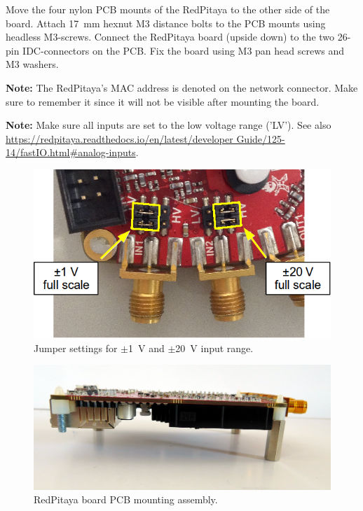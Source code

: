 \documentclass[twoside,a4paper]{refart}
\begin{document}
Move the four nylon PCB mounts of the RedPitaya to the other side of the board. Attach \SI{17}{\milli\meter} hexnut M3 distance bolts to the PCB mounts using headless M3-screws. Connect the RedPitaya board (upside down) to the two 26-pin IDC-connectors on the PCB. Fix the board using M3 pan head screws and M3 washers.

\textbf{Note:} The RedPitaya's MAC address is denoted on the network connector. Make sure to remember it since it will not be visible after mounting the board. 

\textbf{Note:} Make sure all inputs are set to the low voltage range ('LV'). See also \href{https://redpitaya.readthedocs.io/en/latest/developerGuide/125-14/fastIO.html#analog-inputs}{https://redpitaya.readthedocs.io/en/latest/developer Guide/125-14/fastIO.html\#analog-inputs}.
\begin{figure}[H]
	\includegraphics[width=\textwidth]{fig/Jumper_settings_photo.png}
	\caption{Jumper settings for $\pm$\SI{1}{\volt} and $\pm$\SI{20}{\volt} input range.\label{fig:jumper}}
\end{figure}
\begin{figure}[H]
	\includegraphics[width=\textwidth]{fig/mounting.png}
	\caption{RedPitaya board PCB mounting assembly.\label{fig:mounting}}
\end{figure}
\end{document}
